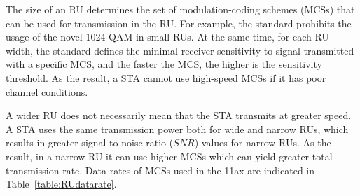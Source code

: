 The size of an RU determines the set of modulation-coding schemes (MCSs) that can be used for transmission in the RU.
For example, the standard prohibits the usage of the novel 1024-QAM in small RUs.
At the same time, for each RU width, the standard defines the minimal receiver sensitivity to signal transmitted with a specific MCS, and the faster the MCS, the higher is the sensitivity threshold.
As the result, a STA cannot use high-speed MCSs if it has poor channel conditions.	

A wider RU does not necessarily mean that the STA transmits at greater speed.
A STA uses the same transmission power both for wide and narrow RUs, which results in greater signal-to-noise ratio ($SNR$) values for narrow RUs.
As the result, in a narrow RU it can use higher MCSs which can yield greater total transmission rate. 
Data rates of MCSs used in the 11ax are indicated in Table~\ref{table:RUdatarate}. 

\begin{table}[t]
	{\centering
		\caption{\label{table:RUdatarate} Data rate in different RU at each MCS in Mbps}
	}
\end{table}	

